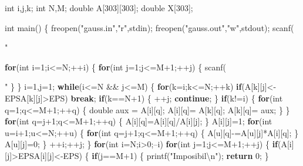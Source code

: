 \documentclass[10pt,]{article}
\newenvironment{Shaded}{}{}
\newcommand{\KeywordTok}[1]{\textcolor[rgb]{0.00,0.44,0.13}{\textbf{{#1}}}}
\newcommand{\DataTypeTok}[1]{\textcolor[rgb]{0.56,0.13,0.00}{{#1}}}
\newcommand{\DecValTok}[1]{\textcolor[rgb]{0.25,0.63,0.44}{{#1}}}
\newcommand{\CharTok}[1]{\textcolor[rgb]{0.25,0.44,0.63}{{#1}}}
\newcommand{\StringTok}[1]{\textcolor[rgb]{0.25,0.44,0.63}{{#1}}}
\newcommand{\NormalTok}[1]{{#1}}
\begin{document}
\begin{Shaded}
\begin{Highlighting}[]
\DataTypeTok{int} \NormalTok{i,j,k;}
\DataTypeTok{int} \NormalTok{N,M;}
\DataTypeTok{double} \NormalTok{A[}\DecValTok{303}\NormalTok{][}\DecValTok{303}\NormalTok{];}
\DataTypeTok{double} \NormalTok{X[}\DecValTok{303}\NormalTok{];}

\DataTypeTok{int} \NormalTok{main()}
\NormalTok{\{}
  \NormalTok{freopen(}\StringTok{"gauss.in"}\NormalTok{,}\StringTok{"r"}\NormalTok{,stdin);}
  \NormalTok{freopen(}\StringTok{"gauss.out"}\NormalTok{,}\StringTok{"w"}\NormalTok{,stdout);}
  \NormalTok{scanf(}\StringTok{"%d%d"}\NormalTok{,&N,&M);}

  \KeywordTok{for}\NormalTok{(}\DataTypeTok{int} \NormalTok{i=}\DecValTok{1}\NormalTok{;i<=N;++i) \{}
    \KeywordTok{for}\NormalTok{(}\DataTypeTok{int} \NormalTok{j=}\DecValTok{1}\NormalTok{;j<=M}\DecValTok{+1}\NormalTok{;++j) \{}
      \NormalTok{scanf(}\StringTok{"%lf"}\NormalTok{,&A[i][j]);}
    \NormalTok{\}}
  \NormalTok{\}}
  \NormalTok{i=}\DecValTok{1}\NormalTok{,j=}\DecValTok{1}\NormalTok{;}
  \KeywordTok{while}\NormalTok{(i<=N && j<=M) \{}
    \KeywordTok{for}\NormalTok{(k=i;k<=N;++k)}
      \KeywordTok{if}\NormalTok{(A[k][j]<-EPS\textbar{}\textbar{}A[k][j]>EPS)}
        \KeywordTok{break}\NormalTok{;}
    \KeywordTok{if}\NormalTok{(k==N}\DecValTok{+1}\NormalTok{) \{}
      \NormalTok{++j;}
      \KeywordTok{continue}\NormalTok{;}
    \NormalTok{\}}
    \KeywordTok{if}\NormalTok{(k!=i) \{}
      \KeywordTok{for}\NormalTok{(}\DataTypeTok{int} \NormalTok{q=}\DecValTok{1}\NormalTok{;q<=M}\DecValTok{+1}\NormalTok{;++q)}
      \NormalTok{\{}
        \DataTypeTok{double} \NormalTok{aux = A[i][q];}
        \NormalTok{A[i][q]= A[k][q];}
        \NormalTok{A[k][q]= aux;}
      \NormalTok{\}}
    \NormalTok{\}}
    \KeywordTok{for}\NormalTok{(}\DataTypeTok{int} \NormalTok{q=j}\DecValTok{+1}\NormalTok{;q<=M}\DecValTok{+1}\NormalTok{;++q) \{}
      \NormalTok{A[i][q]=A[i][q]/A[i][j];}
    \NormalTok{\}}
    \NormalTok{A[i][j]=}\DecValTok{1}\NormalTok{;}
    \KeywordTok{for}\NormalTok{(}\DataTypeTok{int} \NormalTok{u=i}\DecValTok{+1}\NormalTok{;u<=N;++u) \{}
      \KeywordTok{for}\NormalTok{(}\DataTypeTok{int} \NormalTok{q=j}\DecValTok{+1}\NormalTok{;q<=M}\DecValTok{+1}\NormalTok{;++q) \{}
        \NormalTok{A[u][q]-=A[u][j]*A[i][q];}
      \NormalTok{\}}
      \NormalTok{A[u][j]=}\DecValTok{0}\NormalTok{;}
    \NormalTok{\}}
    \NormalTok{++i;++j;}
  \NormalTok{\}}
  \KeywordTok{for}\NormalTok{(}\DataTypeTok{int} \NormalTok{i=N;i>}\DecValTok{0}\NormalTok{;--i)}
    \KeywordTok{for}\NormalTok{(}\DataTypeTok{int} \NormalTok{j=}\DecValTok{1}\NormalTok{;j<=M}\DecValTok{+1}\NormalTok{;++j) \{}
      \KeywordTok{if}\NormalTok{(A[i][j]>EPS\textbar{}\textbar{}A[i][j]<-EPS) \{}
        \KeywordTok{if}\NormalTok{(j==M}\DecValTok{+1}\NormalTok{) \{}
          \NormalTok{printf(}\StringTok{"Imposibil}\CharTok{\textbackslash{}n}\StringTok{"}\NormalTok{);}
          \KeywordTok{return} \DecValTok{0}\NormalTok{;}
        \NormalTok{\}}

}}
\end{Highlighting}
\end{Shaded}
\end{document}
